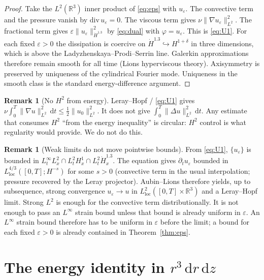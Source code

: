 \documentclass[11pt]{article}
\theoremstyle{definition}
\newtheorem{remark}[theorem]{Remark}
\newcommand{\eps}{\varepsilon}
\newcommand{\R}{\mathbb{R}}
\newcommand{\dd}{\mathrm{d}}
\newcommand{\Hdot}{\dot{H}}
\newcommand{\Lint}{L^{\infty}}
\newcommand{\norm}[2]{\|#1\|_{#2}}
\begin{document}
\begin{proof}
Take the \(L^2(\R^3)\) inner product of \eqref{eq:eps} with \(u_\eps\).
The convective term and the pressure vanish by
\(\mathrm{div}\,u_\eps=0\). The viscous term gives
\(\nu\norm{\nabla u_\eps}{L^2}^2\). The fractional term gives
\(\eps\norm{u_\eps}{\Hdot^{1.3}}^2\) by \eqref{eq:dual} with
\(\varphi=u_\eps\). This is \eqref{eq:U1}.
For each fixed \(\eps>0\) the dissipation is coercive on
\(\Hdot^{1.3}\hookrightarrow H^{1+\delta}\) in three dimensions,
which is above the Ladyzhenskaya--Prodi--Serrin line.
Galerkin approximations therefore remain smooth for all time
(Lions hyperviscous theory). Axisymmetry is preserved by uniqueness
of the cylindrical Fourier mode. Uniqueness in the smooth class is
the standard energy-difference argument.
\end{proof}

\begin{remark}[No \(H^2\) from energy]
\label{rem:no-H2}
Leray--Hopf / \eqref{eq:U1} gives
\(\nu\int_0^T\norm{\nabla u}{L^2}^2\,\dd t\le\tfrac12\norm{u_0}{L^2}^2\).
It does not give \(\int_0^T\norm{\Delta u}{L^2}^2\,\dd t\).
Any estimate that consumes \(H^2\) ``from the energy inequality'' is
circular: \(H^2\) control is what regularity would provide.
We do not do this.
\end{remark}

\begin{remark}[Weak limits do not move pointwise bounds]
\label{rem:weak}
From \eqref{eq:U1}, \(\{u_\eps\}\) is bounded in
\(L^\infty_t L^2_x\cap L^2_t H^1_x\cap L^2_t\Hdot^{1.3}_x\).
The equation gives \(\partial_t u_\eps\) bounded in
\(L^{4/3}_{\mathrm{loc}}([0,T]; H^{-s})\) for some \(s>0\)
(convective term in the usual interpolation; pressure recovered by
the Leray projector). Aubin--Lions therefore yields, up to subsequence,
strong convergence \(u_\eps\to u\) in
\(L^2_{\mathrm{loc}}([0,T]\times\R^3)\) and a Leray--Hopf limit.
Strong \(L^2\) is enough for the convective term distributionally.
It is not enough to pass an \(\Lint\) strain bound unless that bound
is already uniform in \(\eps\).
An \(\Lint\) strain bound therefore has to be uniform in \(\eps\)
before the limit; a bound for each fixed \(\eps>0\) is already
contained in Theorem~\ref{thm:eps}.
\end{remark}

\section{The energy identity in \(r^3\,\dd r\,\dd z\)}
\label{sec:energy}
\end{document}
